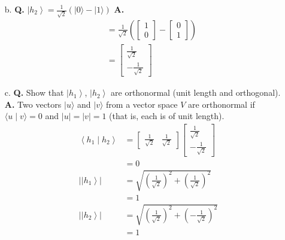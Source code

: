 \documentclass[main.tex]{subfiles}
\begin{document}
\begin{enumerate}
\begin{enumerate}
        \item[b.] \textbf{Q.} $\left|h_{2}\right\rangle=\frac{1}{\sqrt{2}}(|0\rangle-|1\rangle)$ \textbf{A.}
        \begin{align*}
            & = \frac{1}{\sqrt{2}} \left( \left[\begin{array}{l} 1 \\ 0 \end{array}\right] - \left[\begin{array}{l} 0 \\ 1 \end{array}\right] \right)\\
            & = \left[\begin{array}{l} \frac{1}{\sqrt{2}} \\ -\frac{1}{\sqrt{2}} \end{array}\right]             
        \end{align*}
        
        \item[c.] \textbf{Q.} Show that $\left|h_{1}\right\rangle$, $\left|h_{2}\right\rangle$ are orthonormal (unit length and orthogonal). \textbf{A.} Two vectors $|u\rangle$ and $|v\rangle$ from a vector space $V$ are orthonormal if $\langle u \mid v\rangle=0$ and $|u|=|v|=1$ (that is, each is of unit length).
        \begin{align*}
            \left\langle h_{1} \mid h_{2}\right\rangle  & =  \left[\begin{array}{ll} \frac{1}{\sqrt{2}} & \frac{1}{\sqrt{2}} \end{array}\right] 
                                                            \left[\begin{array}{l} \frac{1}{\sqrt{2}} \\ -\frac{1}{\sqrt{2}} \end{array}\right] \\   
                                                        & = 0 \\  
                \left|\left|h_{1}\right\rangle\right|   & = \sqrt{\left(\frac{1}{\sqrt{2}}\right)^2 + \left(\frac{1}{\sqrt{2}}\right)^2} \\
                                                        & = 1 \\
                \left|\left|h_{2}\right\rangle\right|   & = \sqrt{\left(\frac{1}{\sqrt{2}}\right)^2 + \left(-\frac{1}{\sqrt{2}}\right)^2} \\
                                                        & = 1
        \end{align*}
        

\end{enumerate}
\end{enumerate}
\end{document}

